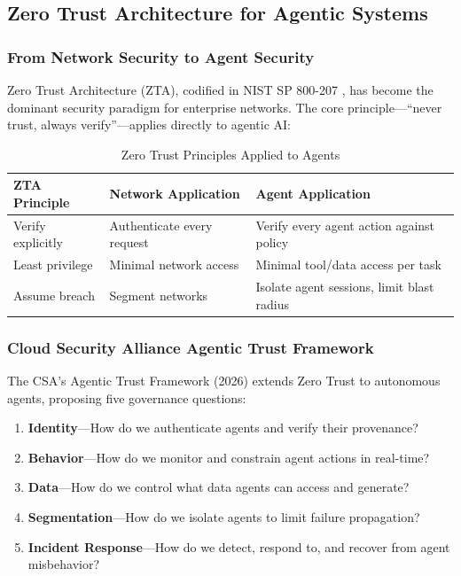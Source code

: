 \subsection{Zero Trust Architecture for Agentic Systems}
\label{subsec:zero-trust}

\subsubsection{From Network Security to Agent Security}

Zero Trust Architecture (ZTA), codified in NIST SP 800-207 \citep{nist800207}, has become the dominant security paradigm for enterprise networks. The core principle---``never trust, always verify''---applies directly to agentic AI:

\begin{table}[htbp]
\centering
\caption{Zero Trust Principles Applied to Agents}
\label{tab:zero-trust-agents}
\begin{tabular}{lll}
\toprule
\textbf{ZTA Principle} & \textbf{Network Application} & \textbf{Agent Application} \\
\midrule
Verify explicitly & Authenticate every request & Verify every agent action against policy \\
Least privilege & Minimal network access & Minimal tool/data access per task \\
Assume breach & Segment networks & Isolate agent sessions, limit blast radius \\
\bottomrule
\end{tabular}
\end{table}

\subsubsection{Cloud Security Alliance Agentic Trust Framework}

The CSA's Agentic Trust Framework (2026) extends Zero Trust to autonomous agents, proposing five governance questions:

\begin{enumerate}
    \item \textbf{Identity}---How do we authenticate agents and verify their provenance?
    \item \textbf{Behavior}---How do we monitor and constrain agent actions in real-time?
    \item \textbf{Data}---How do we control what data agents can access and generate?
    \item \textbf{Segmentation}---How do we isolate agents to limit failure propagation?
    \item \textbf{Incident Response}---How do we detect, respond to, and recover from agent misbehavior?
\end{enumerate}

